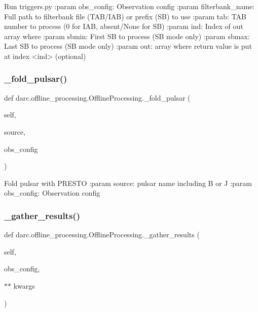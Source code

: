 \begin{DoxyVerb}Run triggers.py
:param obs_config: Observation config
:param filterbank_name: Full path to filterbank file (TAB/IAB) or prefix (SB) to use
:param tab: TAB number to process (0 for IAB, absent/None for SB)
:param ind: Index of out array where
:param sbmin: First SB to process (SB mode only)
:param sbmax: Last SB to process (SB mode only)
:param out: array where return value is put at index <ind> (optional)
\end{DoxyVerb}
 \mbox{\label{classdarc_1_1offline__processing_1_1_offline_processing_a365b8c9dd4245e94518ed76fb4af522d}} 
\subsubsection{\texorpdfstring{\_fold\_pulsar()}{\_fold\_pulsar()}}
{\footnotesize\ttfamily def darc.\+offline\+\_\+processing.\+Offline\+Processing.\+\_\+fold\+\_\+pulsar (\begin{DoxyParamCaption}\item[{}]{self,  }\item[{}]{source,  }\item[{}]{obs\+\_\+config }\end{DoxyParamCaption})\hspace{0.3cm}{\ttfamily [private]}}

\begin{DoxyVerb}Fold pulsar with PRESTO
:param source: pulsar name including B or J
:param obs_config: Observation config
\end{DoxyVerb}
 \mbox{\label{classdarc_1_1offline__processing_1_1_offline_processing_a063c95259a4d840c774dd24e960b3d1f}} 
\subsubsection{\texorpdfstring{\_gather\_results()}{\_gather\_results()}}
{\footnotesize\ttfamily def darc.\+offline\+\_\+processing.\+Offline\+Processing.\+\_\+gather\+\_\+results (\begin{DoxyParamCaption}\item[{}]{self,  }\item[{}]{obs\+\_\+config,  }\item[{$\ast$$\ast$}]{kwargs }\end{DoxyParamCaption})\hspace{0.3cm}{\ttfamily [private]}}

